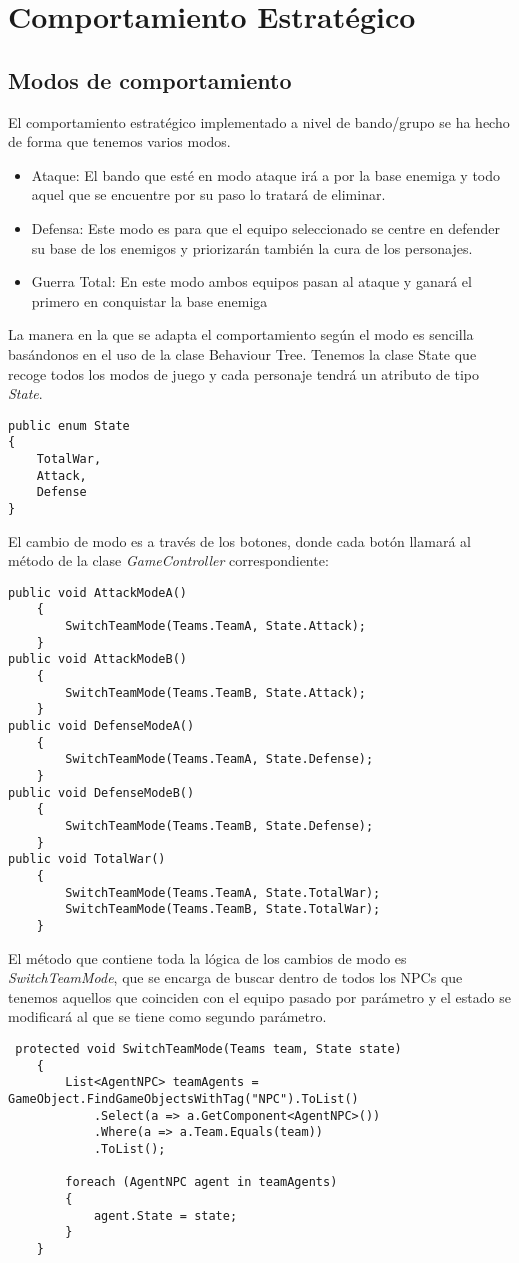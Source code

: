  \section{Comportamiento Estratégico}
 \subsection{Modos de comportamiento}
 El comportamiento estratégico implementado a nivel de bando/grupo se ha hecho de forma que tenemos varios modos.
 \begin{itemize}
     \item Ataque: El bando que esté en modo ataque irá a por la base enemiga y todo aquel que se encuentre por su paso lo tratará de eliminar.
     \item Defensa: Este modo es para que el equipo seleccionado se centre en defender su base de los enemigos y priorizarán también la cura de los personajes.
     \item Guerra Total: En este modo ambos equipos pasan al ataque y ganará el primero en conquistar la base enemiga
 \end{itemize}
La manera en la que se adapta el comportamiento según el modo es sencilla basándonos en el uso de la clase Behaviour Tree. Tenemos la clase State que recoge todos los modos de juego y cada personaje tendrá un atributo de tipo \textit{State}.
 \begin{lstlisting}
public enum State
{
    TotalWar,
    Attack,
    Defense
}
\end{lstlisting}
El cambio de modo es a través de los botones, donde cada botón llamará al método de la clase \textit{GameController} correspondiente:
\begin{lstlisting}
public void AttackModeA()
    {
        SwitchTeamMode(Teams.TeamA, State.Attack);
    }
public void AttackModeB()
    {
        SwitchTeamMode(Teams.TeamB, State.Attack);
    }
public void DefenseModeA()
    {
        SwitchTeamMode(Teams.TeamA, State.Defense);
    }
public void DefenseModeB()
    {
        SwitchTeamMode(Teams.TeamB, State.Defense);
    }
public void TotalWar()
    {
        SwitchTeamMode(Teams.TeamA, State.TotalWar);
        SwitchTeamMode(Teams.TeamB, State.TotalWar);
    }
\end{lstlisting}
El método que contiene toda la lógica de los cambios de modo es 
\textit{SwitchTeamMode}, que se encarga de buscar dentro de todos los NPCs que tenemos  aquellos que coinciden con el equipo pasado por parámetro y el estado se modificará al que se tiene como segundo parámetro.
\begin{lstlisting}
 protected void SwitchTeamMode(Teams team, State state)
    {
        List<AgentNPC> teamAgents = GameObject.FindGameObjectsWithTag("NPC").ToList()
            .Select(a => a.GetComponent<AgentNPC>())
            .Where(a => a.Team.Equals(team))
            .ToList();

        foreach (AgentNPC agent in teamAgents)
        {
            agent.State = state;
        }
    }
\end{lstlisting}